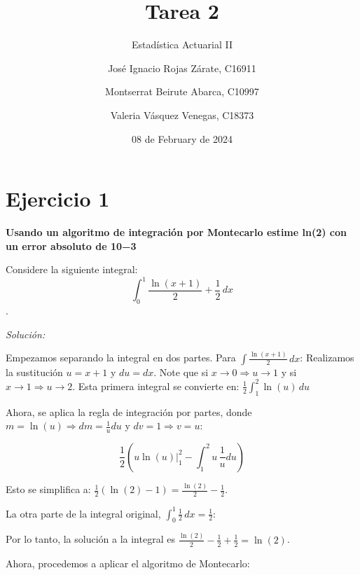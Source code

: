 \documentclass[
]{article}
\title{Tarea 2}
\subtitle{Estadística Actuarial II}
\author{José Ignacio Rojas Zárate, C16911 \and Montserrat Beirute
Abarca, C10997 \and Valeria Vásquez Venegas, C18373}
\date{08 de February de 2024}
\begin{document}
\maketitle

{
\setcounter{tocdepth}{2}
\tableofcontents
}
\newpage

\hypertarget{ejercicio-1}{%
\section{Ejercicio 1}\label{ejercicio-1}}

\textbf{Usando un algoritmo de integración por Montecarlo estime ln(2)
con un error absoluto de 10−3}

Considere la siguiente integral:
\[ \int_{0}^{1} \frac{\ln(x + 1)}{2} + \frac{1}{2} \, dx \].

\emph{Solución:}

Empezamos separando la integral en dos partes. Para
\(\int \frac{\ln(x + 1)}{2} \, dx\): Realizamos la sustitución
\(u = x + 1\) y \(du = dx\). Note que si
\(x \rightarrow 0 \Rightarrow u \rightarrow 1\) y si
\(x \rightarrow 1 \Rightarrow u \rightarrow 2\). Esta primera integral
se convierte en: \(\frac{1}{2} \int_{1}^{2} \ln(u) \, du\)

Ahora, se aplica la regla de integración por partes, donde
\(m = \ln(u) \Rightarrow dm = \frac{1}{u} du\) y
\(dv = 1 \Rightarrow v = u\):

\[ \frac{1}{2} \left( u \ln(u) \Big|_{1}^2 - \int_{1}^{2} u \, \frac{1}{u} du\right) \]

Esto se simplifica a:
\(\frac{1}{2} \left(\ln(2) - 1 \right) = \frac{\ln(2)}{2} - \frac{1}{2}\).

La otra parte de la integral original,
\(\int_{0}^{1} \frac{1}{2} \, dx = \frac{1}{2}\):

Por lo tanto, la solución a la integral es
\(\frac{\ln(2)}{2} - \frac{1}{2} + \frac{1}{2} = \ln(2)\).

Ahora, procedemos a aplicar el algoritmo de Montecarlo:
\end{document}
